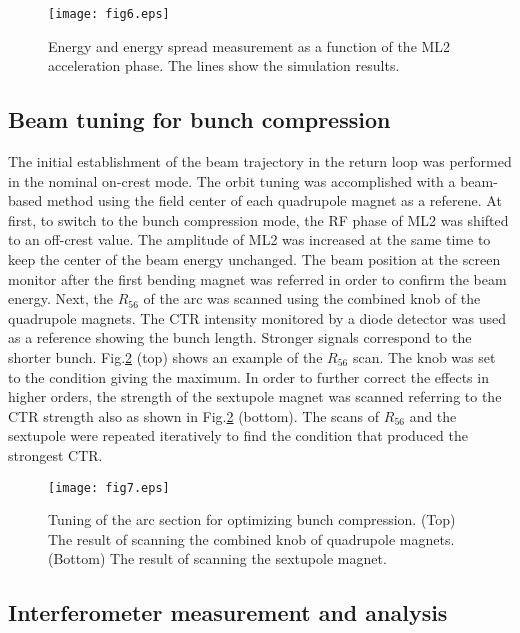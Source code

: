 \documentclass[review]{elsarticle}
\begin{document}
\begin{figure}[htb]
	\begin{center}
	 \texttt{[image: fig6.eps]}
	  \caption{
Energy and energy spread measurement 
as a function of the ML2 acceleration phase.
The lines show the simulation results.
}
	\label{fig:energymeasurement}
\end{center}
\end{figure}


\subsection{Beam tuning for bunch compression}

The initial establishment of the beam trajectory in the return loop
was performed in the nominal on-crest mode.
The orbit tuning was accomplished with a beam-based method
using the field center of each quadrupole magnet as a referene.
At first, to switch to the bunch compression mode,
the RF phase of ML2 was shifted to an off-crest value.
The amplitude of ML2 was increased at the same time
to keep the center of the beam energy unchanged.
The beam position at the screen monitor after the first bending magnet
was referred in order to confirm the beam energy.
Next,
the $R_{56}$ of the arc was scanned 
using the combined knob of the quadrupole magnets.
The CTR intensity monitored by a diode detector was used 
as a reference showing the bunch length.
Stronger signals correspond to the shorter bunch.
Fig.\ref{fig:arcscan} (top) shows an example of the $R_{56}$ scan.
The knob was set to the condition giving the maximum.
In order to further correct the effects in higher orders,
the strength of the sextupole magnet was scanned
referring to the CTR strength also as shown in Fig.\ref{fig:arcscan} (bottom).
The scans of $R_{56}$ and the sextupole
were repeated iteratively to find the condition that produced  the strongest CTR.


\begin{figure}[htb]
	\begin{center}
	 \texttt{[image: fig7.eps]}
	  \caption{
Tuning of the arc section for optimizing bunch compression.
(Top) The result of scanning the combined knob of quadrupole magnets.
(Bottom) The result of scanning the sextupole magnet.
}
	\label{fig:arcscan}
\end{center}
\end{figure}


\subsection{Interferometer measurement and analysis}
\end{document}
